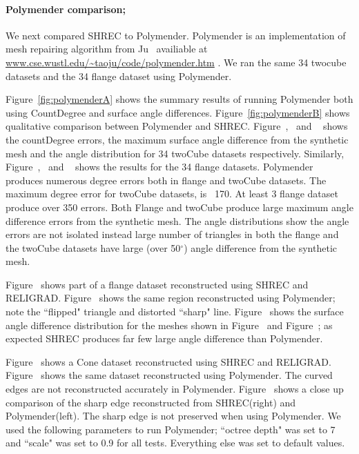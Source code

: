 \paragraph{Polymender comparison;}
We next compared SHREC to Polymender. Polymender is an implementation of mesh repairing algorithm from Ju~\cite{j-rrpm-04} availiable at \url{www.cse.wustl.edu/~taoju/code/polymender.htm} \href{http://www.cse.wustl.edu/~taoju/code/polymender.htm}{}. 
We ran the same 34 twocube datasets and the 34 flange dataset using Polymender. 

Figure~\ref{fig:polymenderA} shows the summary results of running Polymender both using CountDegree and surface angle differences.
Figure~\ref{fig:polymenderB} shows qualitative comparison between Polymender and SHREC. 
Figure~\protect{},~\protect{} and ~\protect{} shows the countDegree errors, the maximum surface angle difference from the synthetic mesh and the angle distribution for 34 twoCube datasets respectively. Similarly, 
Figure~\protect{},~\protect{} and ~\protect{} shows the results for the 34 flange datasets. Polymender produces numerous degree errors both in flange and twoCube datasets. The maximum degree error for twoCube datasets, is ~170. At least 3 flange dataset produce over 350 errors. Both Flange and twoCube produce large maximum angle difference errors from the synthetic mesh. The angle distributions show the angle errors are not isolated instead large number of triangles in both the flange and the twoCube datasets have large (over 50$^\circ$) angle difference from the synthetic mesh.    

Figure~\protect{} shows part of a flange dataset reconstructed using SHREC and RELIGRAD. Figure~\protect{} shows the same region reconstructed using Polymender; note the ``flipped" triangle and distorted ``sharp" line. Figure~\protect{} shows the surface angle  difference distribution for the meshes shown in Figure~\protect{} and Figure~\protect{}; as expected SHREC produces far few large angle difference than Polymender.

Figure~\protect{} shows a Cone dataset reconstructed using SHREC and RELIGRAD. Figure~\protect{} shows the same dataset reconstructed using Polymender. The curved edges are not reconstructed accurately in Polymender. Figure~\protect{} shows a close up comparison of the sharp edge reconstructed from SHREC(right) and Polymender(left). The sharp edge is not preserved when using Polymender.  We used the following parameters to run Polymender; ``octree depth" was set to 7 and ``scale" was set to 0.9 for all tests. Everything else was set to default values. 


